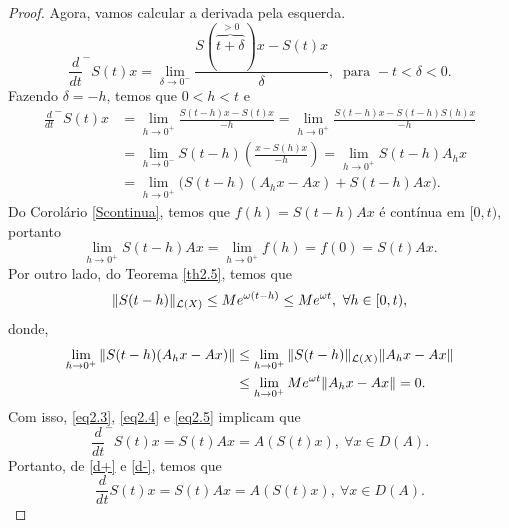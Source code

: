 \begin{proof}
Agora, vamos calcular a derivada pela esquerda.
\[
\frac{d}{dt}^- S(t)x = \lim_{\delta \to 0^-} \frac{S(\overbrace{t+\delta}^{>0})x - S(t)x}{\delta}, \ \text{ para } -t < \delta < 0.
\]
Fazendo $\delta=-h$, temos que $0<h<t$ e 
\begin{equation}\label{eq2.3}
\begin{split}
    \frac{d}{dt}^- S(t)x 
    & = \lim_{h \to 0^+} \frac{S(t-h)x - S(t)x}{-h}=
    \lim_{h \to 0^+} \frac{S(t-h)x - S(t-h)S(h)x}{-h}\\
    &=  \lim_{h \to 0^-} S(t-h)\left(\frac{x - S(h)x}{-h}\right)
    =\lim_{h \to 0^+} S(t-h)A_hx\\
    &= \lim_{h \to 0^+} \Big(S(t-h)(A_hx-Ax)+S(t-h)Ax\Big).
\end{split}
\end{equation}
Do Corolário \eqref{Scontinua}, temos que $f(h)=S(t-h)Ax$ é contínua em $[0,t)$, portanto
\begin{equation}\label{eq2.4}
\lim_{h \to 0^+} S(t-h)Ax=\lim_{h \to 0^+}f(h)=f(0)=S(t)Ax.
\end{equation}
Por outro lado, do Teorema \ref{th2.5}, temos que
\[\|S(t-h)\|_{\mathcal{L}(X)}\leq Me^{\omega(t-h)}\leq Me^{\omega t},\ \forall h\in [0,t),\]
donde,
\begin{equation}\label{eq2.5}
\begin{split}
 \lim_{h \to 0^+}\|S(t-h)(A_hx-Ax)\|
 & \leq \lim_{h \to 0^+}\|S(t-h)\|_{\mathcal{L}(X)}\|A_hx-Ax\|\\
 & \leq \lim_{h \to 0^+}Me^{\omega t}\|A_hx-Ax\|=0.
\end{split}
\end{equation}
Com isso, \eqref{eq2.3}, \eqref{eq2.4} e \eqref{eq2.5} implicam que 
\begin{equation}\label{d-}
\frac{d}{dt}^-S(t)x=S(t)Ax=A(S(t)x),\ \forall x\in D(A).    
\end{equation}
Portanto, de \eqref{d+} e \eqref{d-}, temos que
\begin{equation*}
\frac{d}{dt}S(t)x=S(t)Ax=A(S(t)x),\ \forall x\in D(A).    
\end{equation*}
\end{proof}

